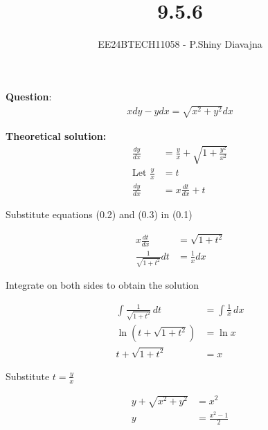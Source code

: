 \documentclass[journal]{IEEEtran}
\begin{document}

\vspace{3cm}

\title{9.5.6}
\author{EE24BTECH11058 - P.Shiny Diavajna}
{\let\newpage\relax\maketitle}

\renewcommand{\thefigure}{\theenumi}
\renewcommand{\thetable}{\theenumi}
\setlength{\intextsep}{10pt} %


\renewcommand{\thetable}{\theenumi}


\textbf{Question}: 
\begin{align}
xdy-ydx = \sqrt{x^2 + y^2}dx
\end{align}

\textbf{Theoretical solution:}
 \begin{align}
\frac{dy}{dx} &= \frac{y}{x}+ \sqrt{1 + \frac{y^2}{x^2}} \\
\text{Let } \frac{y}{x} &= t \\
\frac{dy}{dx} &= x\frac{dt}{dx} + t
\end{align}

Substitute equations (0.2) and (0.3) in (0.1)

\begin{align}
    x\frac{dt}{dx} &= \sqrt{1+{t^2}}\\
    \frac{1}{\sqrt{1+t^2}}  dt &= \frac{1}{x}  dx 
\end{align}

Integrate on both sides to obtain the solution

\begin{align}
\int \frac{1}{\sqrt{1+t^2}} \, dt &= \int \frac{1}{x} \, dx \\
\ln\left(t + \sqrt{1 + t^2}\right) &= \ln x  \\
t + \sqrt{1 + t^2} &= x 
\end{align}

Substitute $t=\frac{y}{x}$

\begin{align}
    y+\sqrt{x^2+y^2}&=x^2\\
    y&=\frac{x^2-1}{2}    
\end{align}
\end{document}
